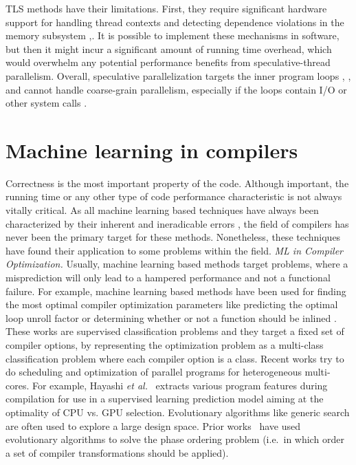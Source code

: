 \quad TLS methods have their limitations. First, they require significant hardware support for handling thread contexts and detecting dependence violations in the memory subsystem \cite{10.1145/1122971.1122997},\cite{10.5555/822079.822712}. It is possible to implement these mechanisms in software, but then it might incur a significant amount of running time overhead, which would overwhelm any potential performance benefits from speculative-thread parallelism. Overall, speculative parallelization targets the inner program loops \cite{4147670}, \cite{10.1145/1150019.1136512}, \cite{10.1145/1122971.1122997} and cannot handle coarse-grain parallelism, especially if the loops contain I/O or other system calls \cite{10.1016/j.parco.2010.05.006}.\newline\null
\section{Machine learning in compilers}
\label{related_work_ml}
\quad Correctness is the most important property of the code. Although important, the running time or any other type of code performance characteristic is not always vitally critical. As all machine learning based techniques have always been characterized by their inherent and ineradicable errors \cite{James:2013:ISL:2517747}, the field of compilers has never been the primary target for these methods. Nonetheless, these techniques have found their application to some problems within the field.\newline\null
\textit{ML in Compiler Optimization.}
Usually, machine learning based methods target problems, where a misprediction will only lead to a hampered performance and not a functional failure. For example, machine learning based methods have been used for finding the most optimal compiler optimization parameters like predicting the optimal loop unroll factor \cite{4907653,1402082} or determining whether or not a function should be inlined \cite{Zhao2003ToIO,1559966}. These works are supervised classification problems and they target a fixed set of compiler options, by representing the optimization problem as a multi-class classification problem where each compiler option is a class. Recent works try to do scheduling and optimization of parallel programs for heterogeneous multi-cores. For example, Hayashi \emph{et al.}~\cite{Hayashi:2015:MPH:2807426.2807429} extracts various program features during compilation for use in a supervised learning prediction model aiming at the optimality of CPU vs. GPU selection. Evolutionary algorithms like generic search are often used to explore a large design space. Prior works~\cite{Almagor:2004:FEC:997163.997196,Cooper:2005:AAC:1065910.1065921,Ashouri:2017:MMC:3132652.3124452} have used evolutionary algorithms to solve the phase ordering problem (i.e.\ in which order a set of compiler transformations should be applied).\newline\null
